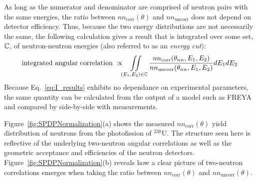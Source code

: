 As long as the numerator and denominator are comprised of neutron pairs with the same energies, the ratio between $nn_{\text{corr}}(\theta)$ and $nn_{\text{uncorr}}$ does not depend on detector efficiency.
Thus, because the two energy distributions are not necessarily the same, the following calculation gives a result that is integrated over some set, $\mathbb{C}$, of neutron-neutron energies (also referred to as an \emph{energy cut}):
\begin{equation}
\label{eq:I_results}
\text{integrated angular correlation }\propto  \iint \limits_{(E_1,E_2 ) \in \mathbb{C}}  \frac{nn_{\text{corr}}(\theta_{nn}, E_1, E_2)}{nn_{\text{uncorr}}(\theta_{nn},E_1, E_2)} dE_1 dE_2
\end{equation}
Because Eq.~\ref{eq:I_results} exhibits no dependance on experimental parameters, the same quantity can be calculated from the output of a model such as FREYA and compared by side-by-side with measurements.

Figure~\ref{fig:SPDPNormalization}(a) shows the measured $nn_{\text{corr}}(\theta)$ yield distribution of neutrons from the photofission of $^{238}$U.
The structure seen here is reflective of the underlying two-neutron angular correlations as well as the geometric acceptance and efficiencies of the neutron detectors.
Figure~\ref{fig:SPDPNormalization}(b) reveals how a clear picture of two-neutron correlations emerges when taking the ratio between $nn_{\text{corr}}(\theta)$ and $nn_{\text{uncorr}}(\theta)$.


